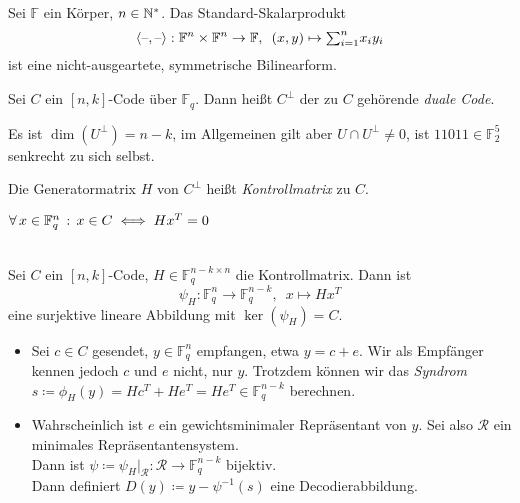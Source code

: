 \documentclass{cheat-sheet}
\newcommand{\F}{\mathbb{F}} %
\newcommand{\scp}[2]{\left\langle #1, #2 \right\rangle} %
\begin{document}
\begin{bem}
  Sei $\F$ ein Körper, $n \in \mathbb{N}^*$.
  Das Standard-Skalarprodukt
  \[
    \scp{\blank}{\blank} : \F^n \times \F^n \to \F,
    \enspace (x, y) \mapsto {\sum}_{i=1}^n x_i y_i
  \]
  ist eine nicht-ausgeartete, symmetrische Bilinearform.
\end{bem}


\begin{defn}
  Sei $C$ ein $[n,k]$-Code über $\F_q$.
  Dann heißt $C^\perp$ der zu $C$ gehörende \emph{duale Code}.
\end{defn}

\begin{acht}
  Es ist $\dim(U^\perp) = n - k$, im Allgemeinen gilt aber $U \cap U^\perp \neq 0$, \zB{} ist $11011 \in \F_2^5$ senkrecht zu sich selbst.
\end{acht}

\begin{defn}
  Die Generatormatrix $H$ von $C^\perp$ heißt \emph{Kontrollmatrix} zu $C$.
\end{defn}

\begin{lem}
  $\fa{x \in \F_q^n} x \in C \iff H x^T = 0$
\end{lem}

\begin{alg} \mbox{} \\
  Sei $C$ ein $[n,k]$-Code, $H \in \F_q^{n-k \times n}$ die Kontrollmatrix.
  Dann ist
  \[ \psi_H : \F_q^n \to \F_q^{n-k}, \enspace x \mapsto H x^T \]
  eine surjektive lineare Abbildung mit $\ker(\psi_H) = C$.
  \begin{itemize}
    \item Sei $c \in C$ gesendet, $y \in \F_q^n$ empfangen, etwa $y = c + e$.
    Wir als Empfänger kennen jedoch $c$ und $e$ nicht, nur $y$.
    Trotzdem können wir das \emph{Syndrom} $s \coloneqq \phi_H(y) = H c^T + H e^T = H e^T \in \F_q^{n-k}$ berechnen.
    \item Wahrscheinlich ist $e$ ein gewichtsminimaler Repräsentant von $y$.
    Sei also $\mathcal{R}$ ein minimales Repräsentantensystem. \\
    Dann ist $\psi \coloneqq \psi_H|_{\mathcal{R}} : \mathcal{R} \to \F_q^{n-k}$ bijektiv. \\
    Dann definiert $D(y) \coloneqq y - \psi^{-1}(s)$ eine Decodierabbildung.
  \end{itemize}
\end{alg}
\end{document}
